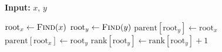\begin{algorithm}[H]
\caption{\textsc{Union}}
\label{alg:union}
\begin{algorithmic}[1]
\State \textbf{Input:} $x$, $y$



\State $\text{root}_x \gets \textsc{Find}(x)$
    \State $\text{root}_y \gets \textsc{Find}(y)$
            \State $\text{parent}[\text{root}_y] \gets \text{root}_x$
        \Else
            \State $\text{parent}[\text{root}_x] \gets \text{root}_y$
                \State $\text{rank}[\text{root}_y] \gets \text{rank}[\text{root}_y] + 1$
            \EndIf
        \EndIf
    \EndIf

\end{algorithmic}
\end{algorithm}
